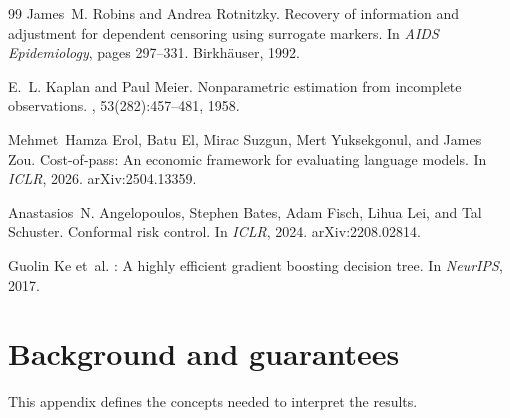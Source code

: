 \documentclass{article}
\begin{document}
{\begin{thebibliography}{99}
James~M. Robins and Andrea Rotnitzky.
\newblock Recovery of information and adjustment for dependent censoring using surrogate markers.
\newblock In {\em AIDS Epidemiology}, pages 297--331. Birkh{\"a}user, 1992.

E.~L. Kaplan and Paul Meier.
\newblock Nonparametric estimation from incomplete observations.
, 53(282):457--481, 1958.

Mehmet~Hamza Erol, Batu El, Mirac Suzgun, Mert Yuksekgonul, and James Zou.
\newblock Cost-of-pass: An economic framework for evaluating language models.
\newblock In {\em ICLR}, 2026.
\newblock arXiv:2504.13359.

Anastasios~N. Angelopoulos, Stephen Bates, Adam Fisch, Lihua Lei, and Tal Schuster.
\newblock Conformal risk control.
\newblock In {\em ICLR}, 2024.
\newblock arXiv:2208.02814.

Guolin Ke et~al.
: A highly efficient gradient boosting decision tree.
\newblock In {\em NeurIPS}, 2017.

\end{thebibliography}
}


\appendix

\section{Background and guarantees}
\label{app:background}

This appendix defines the concepts needed to interpret the results.
\end{document}

